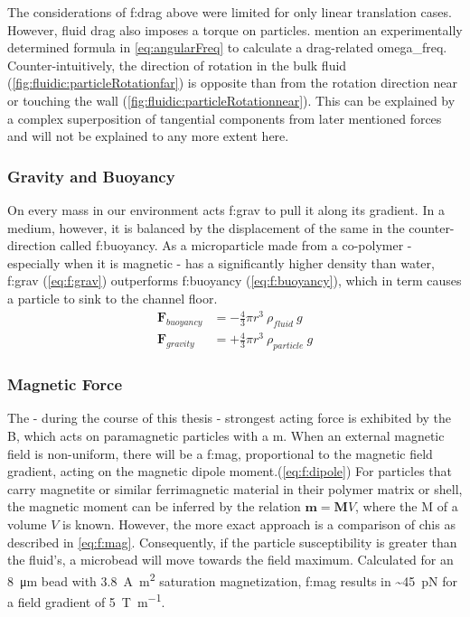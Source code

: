 The considerations of \acrlong{f:drag} above were limited for only linear translation cases. However, fluid drag also imposes a torque on particles. \citet{lit:fluid:Hydrodynamics} mention an experimentally determined formula in \ref{eq:angularFreq} to calculate a drag-related \gls{omega_freq}. Counter-intuitively, the direction of rotation in the bulk fluid (\cref{fig:fluidic:particleRotationfar}) is opposite than from the rotation direction near or touching the wall (\cref{fig:fluidic:particleRotationnear}). This can be explained by a complex superposition of tangential components from later mentioned forces and will not be explained to any more extent here.

\subsubsection{Gravity and Buoyancy}
On every mass in our environment acts \gls{f:grav} to pull it along its gradient. In a medium, however, it is balanced by the displacement of the same in the counter-direction called \gls{f:buoyancy}. As a microparticle made from a co-polymer - especially when it is magnetic - has a significantly higher density than water, \gls{f:grav} (\cref{eq:f:grav}) outperforms \gls{f:buoyancy} (\cref{eq:f:buoyancy}), which in term causes a particle to sink to the channel floor.
\begin{align}
	\mathbf{F}_{buoyancy} &= -\frac{4}{3}\pi r^3 \ \rho_{fluid} \ g \label{eq:f:buoyancy}\\
	\mathbf{F}_{gravity} &= +\frac{4}{3}\pi r^3 \ \rho_{particle} \ g \label{eq:f:grav}
\end{align}


\subsubsection{Magnetic Force}
The - during the course of this thesis - strongest acting force is exhibited by the \gls{B}, which acts on paramagnetic particles with a \gls{m}. When an external magnetic field is non-uniform, there will be a \gls{f:mag}, proportional to the magnetic field gradient, acting on the magnetic dipole moment.(\cref{eq:f:dipole}) For particles that carry magnetite or similar ferrimagnetic material in their polymer matrix or shell, the magnetic moment can be inferred by the relation $\mathbf{m} = \mathbf{M} V$, where the \gls{M} of a volume $V$ is known. However, the more exact approach is a comparison of \glspl{chi} as described in \cref{eq:f:mag}. Consequently, if the particle susceptibility is greater than the fluid's, a microbead will move towards the field maximum. Calculated for an \SI{8}{\micro\meter} bead with \SI{3.8}{\ampere\meter\squared} saturation magnetization, \gls{f:mag} results in \textasciitilde{}\SI{45}{\pico\newton} for a field gradient of \SI{5}{\tesla\per\meter}.

